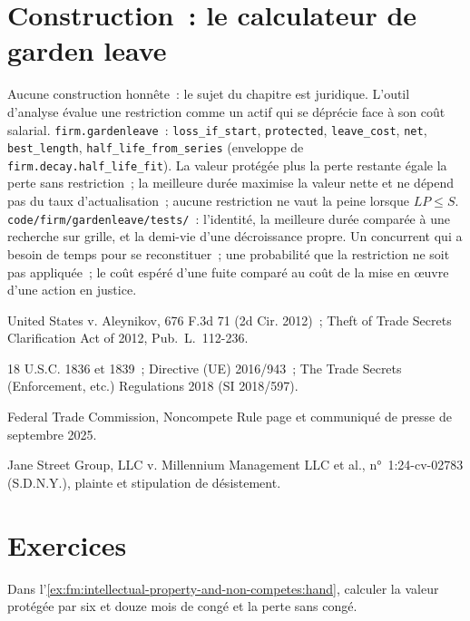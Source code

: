 \section{Construction~: le calculateur de garden leave}\label{bld:fm:intellectual-property-and-non-competes:gardenleave}

\begin{build}
 Aucune construction honnête~: le sujet du chapitre est juridique. L'outil d'analyse évalue une restriction comme un actif qui se déprécie face à son
coût salarial.
 \texttt{firm.gardenleave}~: \texttt{loss\_if\_start}, \texttt{protected}, \texttt{leave\_cost}, \texttt{net}, \texttt{best\_length},
\texttt{half\_life\_from\_series} (enveloppe de \texttt{firm.decay.half\_life\_fit}).
 La valeur protégée plus la perte restante égale la perte sans restriction~; la meilleure durée maximise la valeur nette et ne dépend
pas du taux d'actualisation~; aucune restriction ne vaut la peine lorsque $LP\le S$.
 \texttt{code/firm/gardenleave/tests/}~: l'identité, la meilleure durée comparée à une recherche sur grille, et la demi-vie d'une
décroissance propre.
 Un concurrent qui a besoin de temps pour se reconstituer~; une probabilité que la restriction ne soit pas appliquée~; le coût espéré d'une fuite comparé au
coût de la mise en œuvre d'une action en justice.
\end{build}

\begin{omsources}
\item United States v. Aleynikov, 676 F.3d 71 (2d Cir. 2012)~; Theft of Trade Secrets Clarification Act of 2012, Pub.~L.~112-236.
\item 18 U.S.C. 1836 et 1839~; Directive (UE) 2016/943~; The Trade Secrets (Enforcement, etc.) Regulations 2018 (SI 2018/597).
\item Federal Trade Commission, Noncompete Rule page et communiqué de presse de septembre 2025.
\item Jane Street Group, LLC v. Millennium Management LLC et al., n°~1:24-cv-02783 (S.D.N.Y.), plainte et stipulation de désistement.
\end{omsources}

\section{Exercices}

\begin{exercise}[$\star$]\label{exo:fm:intellectual-property-and-non-competes:1}
Dans l'\cref{ex:fm:intellectual-property-and-non-competes:hand}, calculer la valeur protégée par six et douze mois de congé et la perte sans
congé.
\end{exercise}

